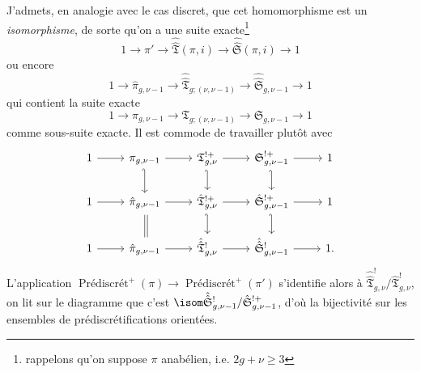 J'admets, en analogie avec le cas discret, que cet homomorphisme est un \emph{isomorphisme}, de sorte qu'on a une suite exacte\footnote{rappelons qu'on suppose $\pi$ anabélien, i.e. $2g+\nu \geq 3$}
$$
1\to \pi'\to\hat{\hat{\mathfrak{T}}}(\pi,i) \to\hat{\hat{\mathfrak{S}}}(\pi,i)\to 1
$$
ou encore
$$
1\to \hat\pi_{g,\nu-1}\to\hat{\hat{\mathfrak{T}}}_{g;(\nu,\nu-1)}\to\hat{\hat{\mathfrak{S}}}_{g,\nu-1}\to 1
$$
qui contient la suite exacte
$$
1\to \pi_{g,\nu-1}\to\mathfrak{T}_{g;(\nu,\nu-1)}
\to\mathfrak{S}_{g,\nu-1}\to 1
$$
comme sous-suite exacte. Il est commode de travailler plutôt avec
\[\begin{tikzcd}
	1 & {\pi_{g,\nu-1}} & {\mathfrak{T}^{!+}_{g,\nu}} & {\mathfrak{S}^{!+}_{g,\nu-1}} & 1 \\
	1 & {\hat{\pi}_{g,\nu-1}} & {\hat{\mathfrak{T}}^{!+}_{g,\nu}} & {\hat{\mathfrak{S}}^{!+}_{g,\nu-1}} & 1 \\
	1 & {\hat{\pi}_{g,\nu-1}} & {\hat{\hat{\mathfrak{T}}}^!_{g,\nu}} & {\hat{\hat{\mathfrak{S}}}^!_{g,\nu-1}} & {1.}
	\arrow[from=1-1, to=1-2]
	\arrow[from=2-1, to=2-2]
	\arrow[from=3-1, to=3-2]
	\arrow[from=1-2, to=1-3]
	\arrow[from=1-3, to=1-4]
	\arrow[from=1-4, to=1-5]
	\arrow[from=2-2, to=2-3]
	\arrow[from=3-2, to=3-3]
	\arrow[from=2-3, to=2-4]
	\arrow[from=3-3, to=3-4]
	\arrow[from=2-4, to=2-5]
	\arrow[from=3-4, to=3-5]
	\arrow[hook', from=1-4, to=2-4]
	\arrow[hook', from=2-4, to=3-4]
	\arrow[hook', from=1-3, to=2-3]
	\arrow[hook', from=2-3, to=3-3]
	\arrow[hook', from=1-2, to=2-2]
	\arrow[shift left=1, shorten <=2pt, shorten >=2pt, no head, from=2-2, to=3-2]
	\arrow[shorten <=2pt, shorten >=2pt, no head, from=2-2, to=3-2]
\end{tikzcd}\]
L'application $\operatorname{Prédiscrét}^+(\pi)\to \operatorname{Prédiscrét}^+(\pi')$ s'identifie alors à $\hat{\hat{\mathfrak{T}}}^!_{g,\nu}/\hat{\mathfrak{T}}^!_{g,\nu}$, on lit sur le diagramme que c'est $ \isom  \hat{\hat{\mathfrak{S}}}^!_{g,\nu-1}/\hat{\mathfrak{S}}^{!+}_{g,\nu-1}$, d'où la bijectivité sur les ensembles de prédiscrétifications orientées.

